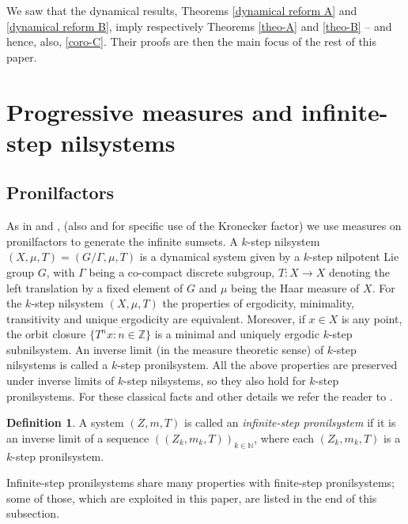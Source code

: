 \documentclass[letter, 11pt]{article}
\theoremstyle{definition}
\newtheorem{defn}[theo]{Definition}
\theoremstyle{plain}
\newcommand{\N}{\mathbb{N}}
\newcommand{\Z}{\mathbb{Z}}
\newcommand{\1}{\mathbbm{1}}
\begin{document}
We saw that the dynamical results, Theorems \ref{dynamical reform A} and \ref{dynamical reform B}, imply respectively Theorems \ref{theo-A} and \ref{theo-B} -- and hence, also, \cref{coro-C}. Their proofs are then the main focus of the rest of this paper. 

\section{Progressive measures and infinite-step nilsystems} \label{section measures and nilsystems}

\subsection{Pronilfactors}

As in \cite{Kra_Moreira_Richter_Robertson:2022} and \cite{kmrr25}, 
(also \cite{host2019short} and 
\cite{Kra_Moreira_Richter_Robertson:2023} for specific use of the Kronecker factor)
we use measures on pronilfactors to generate the infinite sumsets. 
A $k$-step nilsystem $(X,\mu,T) = (G/\Gamma,\mu,T)$ is a dynamical system given by a $k$-step nilpotent Lie group $G$, with $\Gamma$ being a co-compact discrete subgroup, $T \colon X \to X$ denoting the left translation by a fixed element of $G$ and $\mu$ being the Haar measure of $X$. For the $k$-step nilsystem $(X,\mu,T)$ the properties of ergodicity, minimality, transitivity and unique ergodicity are equivalent. Moreover, if $x \in X$ is any point, the orbit closure $\overline {\{ T^n x \colon n \in \Z \}} $ is a minimal and uniquely ergodic $k$-step subnilsystem. An inverse limit (in the measure theoretic sense) of $k$-step nilsystems is called a $k$-step pronilsystem. 
All the above properties are preserved under inverse limits of $k$-step nilsystems, so they also hold for $k$-step pronilsystems. For these classical facts and other details we refer the reader to \cite[Chapter 11 and Chapter 13]{Host_Kra_nilpotent_structures_ergodic_theory:2018}.  

\begin{defn}
A system $(Z,m,T)$ is called an \emph{infinite-step pronilsystem} if it is 
an inverse limit of a sequence $\left((Z_k, m_k,T)\right)_{k\in \N}$, where each $(Z_k, m_k, T)$ is a $k$-step pronilsystem. 
\end{defn}
Infinite-step pronilsystems share many properties with finite-step pronilsystems; some of those, which are exploited in this paper, are listed in the end of this subsection. 
\end{document}
